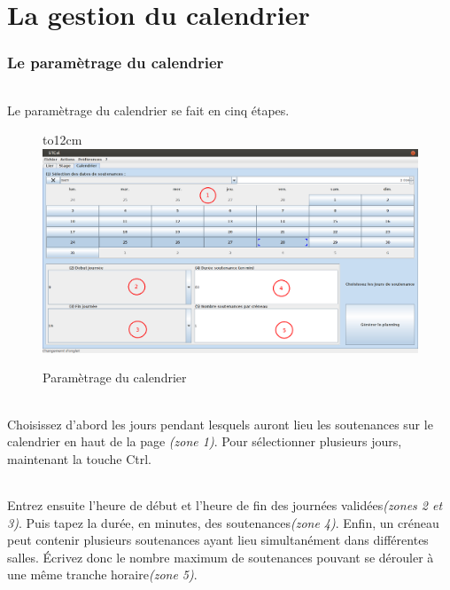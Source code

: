 \documentclass[a4paper,10pt]{report}
\begin{document}
    
\part{La gestion du calendrier}
  \setcounter{section}{0}
    \section{Le paramètrage du calendrier}
      \paragraph{}
	Le paramètrage du calendrier se fait en cinq étapes.
	
      \begin{figure}[H]
	  \hbox to12cm{\hss\includegraphics[width=18cm]{../general/Calendrier.png}\hss}
	  \caption{Paramètrage du calendrier}
	\end{figure}
	
	
      \paragraph{}
	Choisissez d'abord les jours pendant lesquels auront lieu les soutenances sur le calendrier en haut de la page \textit{(zone 1)}.
	Pour sélectionner plusieurs jours, maintenant la touche Ctrl.
      
      \paragraph{}
	Entrez ensuite l'heure de début et l'heure de fin des journées validées\textit{(zones 2 et 3)}.
	Puis tapez la durée, en minutes, des soutenances\textit{(zone 4)}.
	Enfin, un créneau peut contenir plusieurs soutenances ayant lieu simultanément dans différentes salles.
	Écrivez donc le nombre maximum de soutenances pouvant se dérouler à une même tranche horaire\textit{(zone 5)}.
      
\end{document}
